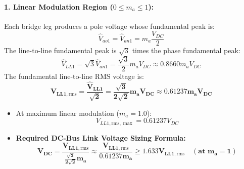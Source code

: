 \paragraph{1. Linear Modulation Region ($0 \le m_a \le 1$):}
Each bridge leg produces a pole voltage whose fundamental peak is:
\begin{equation}
\hat{V}_{ao1} = \hat{V}_{an1} = m_a \frac{V_{DC}}{2}
\end{equation}
The line-to-line fundamental peak is $\sqrt{3}$ times the phase fundamental peak:
\begin{equation}
\hat{V}_{LL1} = \sqrt{3} \hat{V}_{an1} = \frac{\sqrt{3}}{2} m_a V_{DC} \approx 0.8660 m_a V_{DC}
\end{equation}
The fundamental line-to-line RMS voltage is:
\begin{equation}
\label{eq:vll1_rms_spwm}
\mathbf{V_{LL1,\mathrm{rms}} = \frac{\hat{V}_{LL1}}{\sqrt{2}} = \frac{\sqrt{3}}{2\sqrt{2}} m_a V_{DC} \approx 0.61237 m_a V_{DC}}
\end{equation}
\begin{itemize}
  \item At maximum linear modulation ($m_a = 1.0$):
  \begin{equation}
  V_{LL1,\mathrm{rms},\max} = 0.61237 V_{DC}
  \end{equation}
  \item \textbf{Required DC-Bus Link Voltage Sizing Formula:}
  \begin{equation}
  \label{eq:vdc_required}
  \mathbf{V_{DC} = \frac{V_{LL1,\mathrm{rms}}}{\frac{\sqrt{3}}{2\sqrt{2}} m_a} \approx \frac{V_{LL1,\mathrm{rms}}}{0.61237 m_a} \ge 1.633 V_{LL1,\mathrm{rms}} \quad (\text{at } m_a = 1)}
  \end{equation}
\end{itemize}

